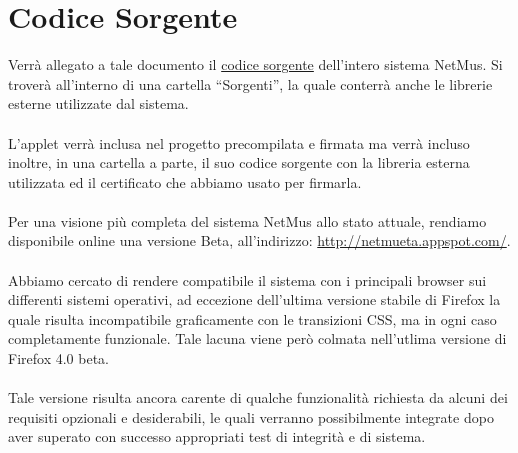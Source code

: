 \chapter{Codice Sorgente}
\thispagestyle{fancy} %

Verr\`a allegato a tale documento il \underline{codice sorgente} dell'intero
sistema NetMus. Si trover\`a all'interno di una cartella ``Sorgenti'', la quale conterr\`a anche
le librerie esterne utilizzate dal sistema.\\
\\
L'applet verr\`a inclusa nel progetto precompilata e firmata ma verr\`a incluso
inoltre, in una cartella a parte, il suo codice sorgente con la libreria
esterna utilizzata ed il certificato che abbiamo usato per firmarla.\\
\\
Per una visione pi\`u completa del sistema NetMus allo stato attuale, rendiamo
disponibile online una versione Beta, all'indirizzo:
\url{http://netmueta.appspot.com/}.\\
\\
Abbiamo cercato di rendere compatibile il sistema con i principali
browser sui differenti sistemi operativi, ad eccezione dell'ultima versione
stabile di Firefox la quale risulta incompatibile graficamente con le
transizioni CSS, ma in ogni caso completamente funzionale. Tale lacuna viene
per\`o colmata nell'utlima versione di Firefox 4.0 beta.\\
\\
Tale versione risulta ancora carente di qualche funzionalit\`a richiesta da
alcuni dei requisiti opzionali e desiderabili, le quali verranno possibilmente
integrate dopo aver superato con successo appropriati test di integrit\`a e di
sistema.

\listoftables
{}
\listoffigures
{}

